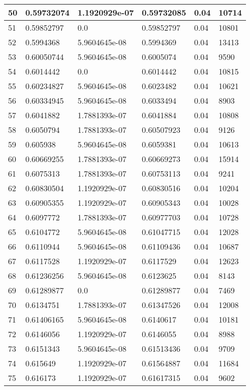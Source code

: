\begin{longtable}{|l|l|l|l|l|l|}
50 & 0.59732074 & 1.1920929e-07 & 0.59732085 & 0.04 & 10714 \\ \hline 
51 & 0.59852797 & 0.0 & 0.59852797 & 0.04 & 10801 \\ \hline 
52 & 0.5994368 & 5.9604645e-08 & 0.5994369 & 0.04 & 13413 \\ \hline 
53 & 0.60050744 & 5.9604645e-08 & 0.6005074 & 0.04 & 9590 \\ \hline 
54 & 0.6014442 & 0.0 & 0.6014442 & 0.04 & 10815 \\ \hline 
55 & 0.60234827 & 5.9604645e-08 & 0.6023482 & 0.04 & 10621 \\ \hline 
56 & 0.60334945 & 5.9604645e-08 & 0.6033494 & 0.04 & 8903 \\ \hline 
57 & 0.6041882 & 1.7881393e-07 & 0.6041884 & 0.04 & 10808 \\ \hline 
58 & 0.6050794 & 1.7881393e-07 & 0.60507923 & 0.04 & 9126 \\ \hline 
59 & 0.605938 & 5.9604645e-08 & 0.6059381 & 0.04 & 10613 \\ \hline 
60 & 0.60669255 & 1.7881393e-07 & 0.60669273 & 0.04 & 15914 \\ \hline 
61 & 0.6075313 & 1.7881393e-07 & 0.60753113 & 0.04 & 9241 \\ \hline 
62 & 0.60830504 & 1.1920929e-07 & 0.60830516 & 0.04 & 10204 \\ \hline 
63 & 0.60905355 & 1.1920929e-07 & 0.60905343 & 0.04 & 10028 \\ \hline 
64 & 0.6097772 & 1.7881393e-07 & 0.60977703 & 0.04 & 10728 \\ \hline 
65 & 0.6104772 & 5.9604645e-08 & 0.61047715 & 0.04 & 12028 \\ \hline 
66 & 0.6110944 & 5.9604645e-08 & 0.61109436 & 0.04 & 10687 \\ \hline 
67 & 0.6117528 & 1.1920929e-07 & 0.6117529 & 0.04 & 12623 \\ \hline 
68 & 0.61236256 & 5.9604645e-08 & 0.6123625 & 0.04 & 8143 \\ \hline 
69 & 0.61289877 & 0.0 & 0.61289877 & 0.04 & 7469 \\ \hline 
70 & 0.6134751 & 1.7881393e-07 & 0.61347526 & 0.04 & 12008 \\ \hline 
71 & 0.61406165 & 5.9604645e-08 & 0.6140617 & 0.04 & 10181 \\ \hline 
72 & 0.6146056 & 1.1920929e-07 & 0.6146055 & 0.04 & 8988 \\ \hline 
73 & 0.6151343 & 5.9604645e-08 & 0.61513436 & 0.04 & 9709 \\ \hline 
74 & 0.615649 & 1.1920929e-07 & 0.61564887 & 0.04 & 11684 \\ \hline 
75 & 0.616173 & 1.1920929e-07 & 0.61617315 & 0.04 & 9602 \\ \hline 
\end{longtable}